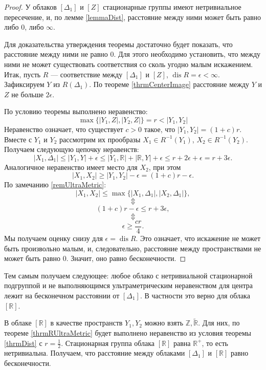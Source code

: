 \documentclass[11pt,twoside,draft
]{article}
\DeclareMathOperator{\dis}{dis}
\begin{document}
\begin{proof} У облаков $[\Delta_1]$ и $[Z]$ стационарные группы имеют
	нетривиальное пересечение, и, по лемме \ref{lemmaDist},
	расстояние между ними может быть
	равно либо $0$, либо $\infty$. 
	
	Для доказательства утверждения теоремы
	достаточно будет показать, что расстояние между ними не равно $0$.  Для этого
	необходимо установить, что между ними не может существовать соответствия со
	сколь угодно малым искажением. Итак, пусть $R$ --- соответствие между
	$[\Delta_1]$ и $[Z]$, $\dis R = \epsilon < \infty$.
	Зафиксируем $Y$ из $R(\Delta_1)$. По теореме \ref{thrmCenterImage} расстояние между $Y$ и $Z$ не
	больше $2\epsilon$.
	
	По условию теоремы выполнено неравенство:
	$$\max\big\{ |Y_{1},Z|, |Y_{2}, Z| \big\} = r < |Y_{1}, Y_{2}|$$
	Неравенство означает, что существует $c > 0$ такое, что
	$|Y_{1},Y_{2}| = (1 + c)r.$ Вместе с $Y_{1}$ и
	$ Y_{2}$ рассмотрим их прообразы $X_1 \in R^{-1}(Y_{1})$,
	$ X_2 \in R^{-1}(Y_{2})$. Получаем следующую цепочку
	неравенств:
	$$|X_1, \Delta_1| \le |Y_{1}, Y| + \epsilon \le |Y_{1}, \mathbb{R}| + |\mathbb{R}, Y| +\epsilon \le r + 2\epsilon + \epsilon = r + 3\epsilon.$$
	Аналогичное неравенство имеет место для $X_2$, при этом
	$$|X_1, X_2|  \ge |Y_{1}, Y_{2}| - \epsilon = (1+c)r - \epsilon.$$
	По замечанию \ref{remUltraMetric}:
	$$|X_1, X_2| \le \max\big\{ |X_1, \Delta_1|, |X_2, \Delta_1| \big\},$$
	$$\Updownarrow$$
	$$(1+c)r - \epsilon\le r + 3\epsilon,$$
	$$\Updownarrow$$
	$$\epsilon \ge \frac{cr}{4}.$$
	Мы получаем оценку снизу для $\epsilon = \dis R$. Это означает, что
	искажение не может быть произвольно малым, и, следовательно, расстояние между
	пространствами не может быть равно 0. Значит, оно равно бесконечности.
	
\end{proof}

Тем самым получаем следующее: любое облако с нетривиальной стационарной подгруппой
и не выполняющимся ультраметрическим неравенством для центра лежит
на бесконечном расстоянии от $[\Delta_{1}]$. В частности это верно
для облака $[\mathbb{R}]$.

\begin{corollary}
	В облаке $[\mathbb{R}]$ в качестве пространств $Y_{1}, Y_{2}$ можно взять
	$\mathbb{Z}, \widetilde{\mathbb{R}}$. Для них, по теореме \ref{thrmRUltraMetric} будет выполнено
	неравенство из условия теоремы
	\ref{thrmDist}
	с $r = \frac 1 2$. Стационарная группа облака
	$[\mathbb{R}]$ равна $\mathbb{R}^{+}$, то есть нетривиальна. Получаем, что расстояние между облаками
	$[\Delta_{1}]$ и $[\mathbb{R}]$ равно бесконечности.
\end{corollary}
\end{document}
